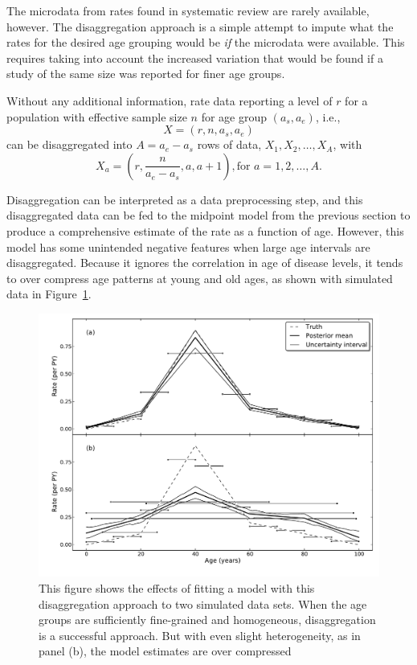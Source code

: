 The microdata from rates found in systematic review are rarely
available, however. The disaggregation approach is a simple attempt to
impute what the rates for the desired age grouping would be \emph{if}
the microdata were available. This requires taking into account the
increased variation that would be found if a study of the same size
was reported for finer age groups.

Without any additional information, rate data reporting a level of $r$
for a population with effective sample size $n$ for age group $(a_s,a_e)$, i.e.,
\[
X = (r, n, a_s, a_e)
\]
can be disaggregated into $A = a_e-a_s$ rows of
data, $X_1, X_2, \ldots, X_A$, with 
\[ 
X_a = \left(r, \frac{n}{a_e-a_s}, a, a+1\right), \text{for } a=1,2,\ldots,A. 
\]

Disaggregation can be interpreted as a data preprocessing step, and
this disaggregated data can be fed to the midpoint model from the
previous section to produce a comprehensive estimate of the rate as a
function of age. However, this model has some unintended negative
features when large age intervals are disaggregated.  Because it
ignores the correlation in age of disease levels, it tends to
over compress age patterns at young and old ages, as shown with simulated data in Figure~\ref{disagg}.

\begin{figure}[h]
\begin{center}
\includegraphics[width=\textwidth]{age_group_disagg.pdf}
\caption{This figure shows the effects of fitting a model with this
  disaggregation approach to two simulated data sets.  When the age groups are sufficiently
  fine-grained and homogeneous, disaggregation is a successful
  approach.  But with even slight heterogeneity, as in panel (b), the model
  estimates are over compressed}
\label{disagg}
\end{center}
\end{figure}


